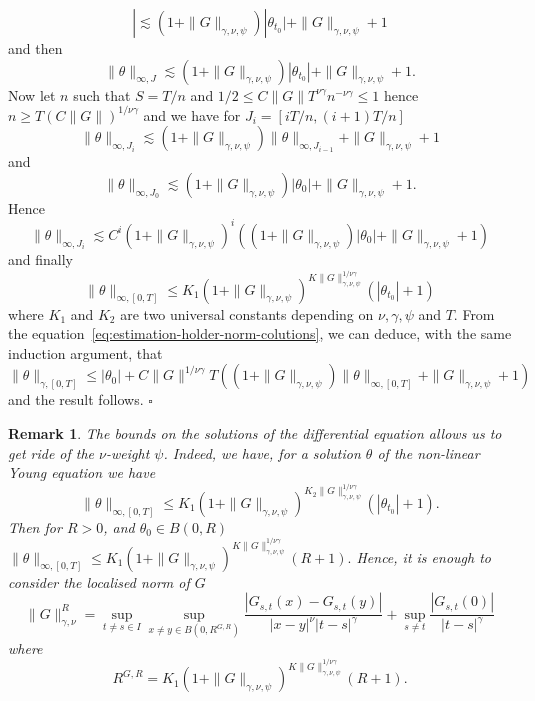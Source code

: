 \documentclass[a4paper,11pt]{article}
\newtheorem{remark}[theorem]{Remark}
\newenvironment{proof}{{\sc Proof.}}{\hfill$\square$}
\begin{document}
\begin{proof}
\[     | \lesssim ( 1+ \| G \|_{\gamma , \nu , \psi} ) | \theta_{t_{0}} | + \| G
     \|_{\gamma , \nu , \psi} +1 \]
  and then
  \[ \| \theta \|_{\infty ,J} \lesssim ( 1+ \| G \|_{\gamma , \nu , \psi} ) |
     \theta_{t_{0}} | + \| G \|_{\gamma , \nu , \psi} +1. \]
  Now let $n$ such that $S=T/n$ and $1/2 \leqslant C  \| G \| T^{\nu \gamma}
  n^{- \nu \gamma} \leqslant 1$ hence $n \geqslant T ( C \| G \| )^{1/ \nu
  \gamma}$ and we have for $J_{i} = [ i T/n, ( i+1 ) T/n ]$
  \[ \| \theta \|_{\infty ,J_{i}} \lesssim ( 1+ \| G \|_{\gamma , \nu , \psi}
     ) \| \theta \|_{\infty ,J_{i-1}} + \| G \|_{\gamma , \nu , \psi} +1 \]
  and
  \[ \| \theta \|_{\infty ,J_{0}} \lesssim ( 1+ \| G \|_{\gamma , \nu , \psi}
     ) | \theta_{0} | + \| G \|_{\gamma , \nu , \psi} +1. \]
  Hence
  \[ \| \theta \|_{\infty ,J_{i}} \lesssim C^{i} ( 1+ \| G \|_{\gamma , \nu ,
     \psi} )^{i} ( ( 1+ \| G \|_{\gamma , \nu , \psi} ) | \theta_{0} | + \| G
     \|_{\gamma , \nu , \psi} +1 ) \]
  and finally
  \[ \| \theta \|_{\infty , [ 0,T ]} \leqslant K_{1} ( 1+ \| G \|_{\gamma ,
     \nu , \psi} )^{K \| G \|_{\gamma , \nu , \psi}^{1/ \nu \gamma}} ( |
     \theta_{t_{0}} | +1 ) \]
  where $K_{1}$ and $K_{2}$ are two universal constants depending on $\nu ,
  \gamma , \psi  $ and $T$. From the
  equation~{\eqref{eq:estimation-holder-norm-colutions}}, we can deduce,
  with the same induction argument, that
  \[ \| \theta \|_{\gamma , [ 0,T ]} \leqslant | \theta_{0} | +C \| G \|^{1/
     \nu \gamma} T ( ( 1+ \| G \|_{\gamma , \nu , \psi} ) \| \theta \|_{\infty
     , [ 0,T ]} + \| G \|_{\gamma , \nu , \psi} +1 ) \]
  and the result follows.
\end{proof}

\begin{remark}
  \label{remark:localization_principle}The bounds on the solutions of the
  differential equation allows us to get ride of the $\nu$-weight $\psi$.
  Indeed, we have, for a solution $\theta$ of the non-linear Young equation we
  have
  \[ \| \theta \|_{\infty , [ 0,T ]} \leqslant K_{1} ( 1+ \| G \|_{\gamma ,
     \nu , \psi} )^{K_{2} \| G \|_{\gamma , \nu , \psi}^{1/ \nu \gamma}} ( |
     \theta_{t_{0}} | +1 ) . \]
  Then for $R>0$, and $\theta_{0} \in B ( 0,R )$ $\| \theta \|_{\infty , [ 0,T
  ]} \leqslant K_{1} ( 1+ \| G \|_{\gamma , \nu , \psi} )^{K \| G \|_{\gamma ,
  \nu , \psi}^{1/ \nu \gamma}} ( R+1 ) .$ Hence, it is enough to consider the
  localised norm of $G$
  \[ \| G \|^{R}_{\gamma , \nu} = \sup_{t \neq s \in I} \sup_{x \neq y \in B (
     0,R^{G,R} )} \frac{| G_{s,t} ( x ) -G_{s,t} ( y ) |}{| x-y |^{\nu} | t-s
     |^{\gamma}} + \sup_{s \neq t} \frac{| G_{s,t} ( 0 ) |}{| t-s |^{\gamma}}
  \]
  where
  \[ R^{G,R} =K_{1} ( 1+ \| G \|_{\gamma , \nu , \psi} )^{K \| G \|_{\gamma ,
     \nu , \psi}^{1/ \nu \gamma}} ( R+1 ) . \]
\end{remark}
\end{document}
